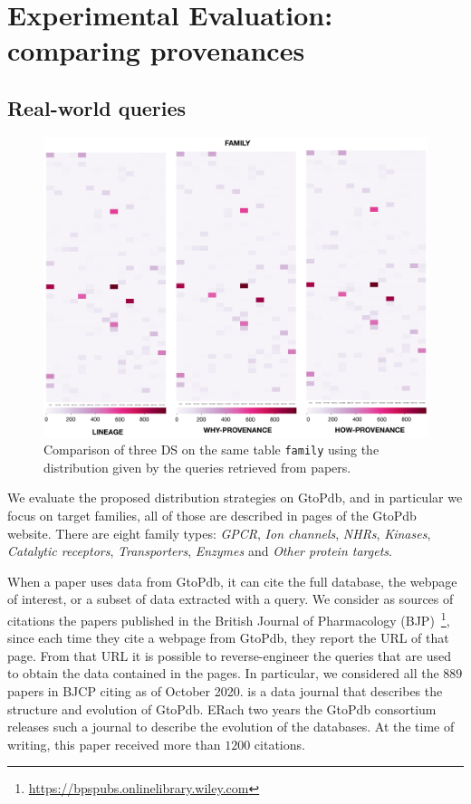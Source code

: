 \section{Experimental Evaluation: comparing provenances}
\label{sec:experiments}

\subsection{Real-world queries}
\label{sec:real_world_queries}

\begin{figure}[t]
  \includegraphics[width=1\textwidth]{figures/paper_based}
  \caption{Comparison of three DS on the same table \texttt{family} using the distribution given by the queries retrieved from papers.}
  \label{figure:comparison_on_papers}
\end{figure}


We evaluate the proposed distribution strategies on GtoPdb, and in particular we focus on target families, all of those are described in pages of the GtoPdb website. 
There are eight family types: \emph{GPCR}, \emph{Ion channels}, \emph{NHRs}, \emph{Kinases}, \emph{Catalytic receptors}, \emph{Transporters}, \emph{Enzymes} and \emph{Other protein targets}.  

When a paper uses data from GtoPdb, it can cite the full database, the webpage of interest, or a subset of data extracted with a query. 
We consider as sources of citations the papers published in the British Journal of Pharmacology (BJP)~\footnote{\url{https://bpspubs.onlinelibrary.wiley.com}}, since each time they cite a webpage from GtoPdb, they report the URL of that page. From that URL it is possible to reverse-engineer the queries that are used to obtain the data contained in the pages. 
In particular, we considered all the $889$ papers in BJCP citing \citep{iuphar2018} as of October 2020. \citep{iuphar2018} is a data journal that describes the structure and evolution of GtoPdb. ERach two years the GtoPdb consortium releases such a journal to describe the evolution of the databases.
At the time of writing, this paper received more than $1200$ citations. 

